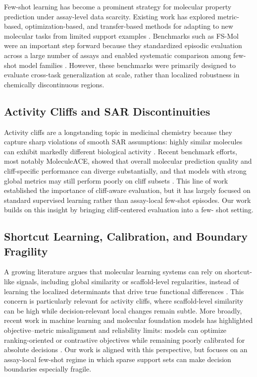 \documentclass{article}
\begin{document}
Few-shot learning has become a prominent strategy for molecular property prediction under assay-level data
scarcity. Existing work has explored metric-based, optimization-based, and transfer-based methods for adapting to
new molecular tasks from limited support examples \cite{fsmol,protonet,maml}. Benchmarks such
as FS-Mol were an important step forward because they standardized episodic evaluation across a large number of
assays and enabled systematic comparison among few-shot model families \cite{fsmol}. However, these benchmarks
were primarily designed to evaluate cross-task generalization at scale, rather than localized robustness in
chemically discontinuous regions.

\subsection{Activity Cliffs and SAR Discontinuities}

Activity cliffs are a longstanding topic in medicinal chemistry because they capture sharp violations of smooth
SAR assumptions: highly similar molecules can exhibit markedly different biological activity
\cite{activity_cliffs_review,moleculeace}. Recent benchmark efforts, most notably MoleculeACE, showed that overall
molecular prediction quality and cliff-specific performance can diverge substantially, and that models with strong
global metrics may still perform poorly on cliff subsets \cite{moleculeace}. This line of work established the
importance of cliff-aware evaluation, but it has largely focused on standard supervised learning rather than
assay-local few-shot episodes. Our work builds on this insight by bringing cliff-centered evaluation into a few-
shot setting.

\subsection{Shortcut Learning, Calibration, and Boundary Fragility}

A growing literature argues that molecular learning systems can rely on shortcut-like signals, including global
similarity or scaffold-level regularities, instead of learning the localized determinants that drive true
functional differences \cite{shortcut_learning,molecular_shortcuts}. This concern is particularly relevant for
activity cliffs, where scaffold-level similarity can be high while decision-relevant local changes remain subtle.
More broadly, recent work in machine learning and molecular foundation models has highlighted objective--metric
misalignment and reliability limits: models can optimize ranking-oriented or contrastive objectives while remaining
poorly calibrated for absolute decisions \cite{metric_misalignment,uncertainty_mol}. Our work is aligned with this
perspective, but focuses on an assay-local few-shot regime in which sparse support sets can make decision
boundaries especially fragile.
\end{document}
